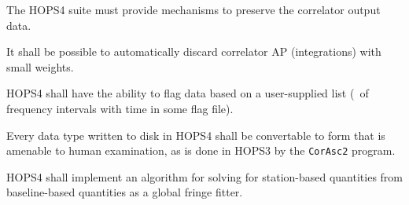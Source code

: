 \begin{description}

 The HOPS4 suite must provide mechanisms to preserve the correlator 
output data.
    
 It shall be possible to automatically discard correlator 
\acs{AP} (integrations) with small weights.

 HOPS4 shall have the ability to flag data based on a user-supplied 
list (\eg~of frequency intervals with time in some flag file).

 Every data type written to disk in HOPS4 shall be convertable to 
form that is amenable to human examination, as is done in HOPS3 by the 
\texttt{\acs{CorAsc2}} program.

 HOPS4 shall implement an algorithm for solving for station-based 
quantities from baseline-based quantities as a global fringe fitter.




\end{description}
